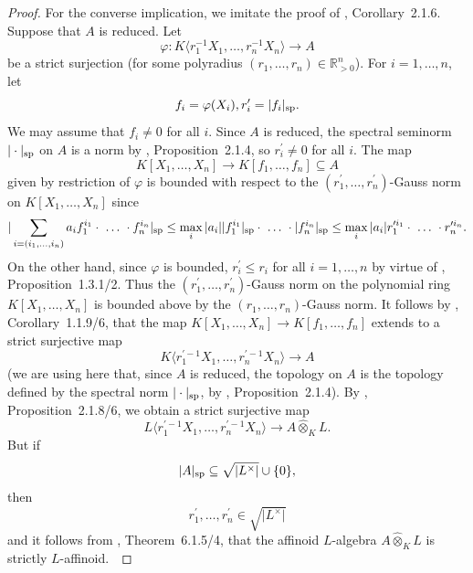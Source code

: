 \begin{proof}
For the converse implication, we imitate the proof of \cite{Berkovich}, Corollary~2.1.6. Suppose that $A$ is reduced. Let \begin{equation*}\varphi: K\langle r_{1}^{-1}X_{1},\dots, r_{n}^{-1}X_{n}\rangle\to A\end{equation*}be a strict surjection (for some polyradius $(r_1,\dots, r_n)\in\mathbb{R}_{>0}^{n}$). For $i=1,\dots, n$, let \begin{equation*}f_{i}=\varphi(X_{i}), r_{i}^{\prime}=\vert f_{i}\vert_{\mathrm{sp}}.\end{equation*}We may assume that $f_{i}\neq0$ for all $i$. Since $A$ is reduced, the spectral seminorm $\vert\cdot\vert_{\mathrm{sp}}$ on $A$ is a norm by \cite{Berkovich}, Proposition~2.1.4, so $r_{i}^{\prime}\neq 0$ for all $i$. The map \begin{equation*}K[X_1,\dots, X_n]\to K[f_1,\dots, f_n]\subseteq A\end{equation*}given by restriction of $\varphi$ is bounded with respect to the $(r_{1}^{\prime},\dots, r_{n}^{\prime})$-Gauss norm on $K[X_1,\dots, X_n]$ since \begin{equation*}\vert \sum_{i=(i_1,\dots, i_n)}a_{i}f_{1}^{i_{1}}\cdot~\dots~\cdot f_{n}^{i_{n}}\vert_{\mathrm{sp}}\leq \max_{i}\vert a_{i}\vert \vert f_{1}^{i_{1}}\vert_{\mathrm{sp}}\cdot~\dots~\cdot \vert f_{n}^{i_{n}}\vert_{\mathrm{sp}}\leq\max_{i}\vert a_{i}\vert r_{1}^{\prime i_{1}}\cdot~\dots~\cdot r_{n}^{\prime i_{n}}.\end{equation*}On the other hand, since $\varphi$ is bounded, $r_{i}^{\prime}\leq r_{i}$ for all $i=1,\dots, n$ by virtue of \cite{BGR}, Proposition~1.3.1/2. Thus the $(r_{1}^{\prime},\dots, r_{n}^{\prime})$-Gauss norm on the polynomial ring $K[X_1,\dots, X_n]$ is bounded above by the $(r_1,\dots, r_n)$-Gauss norm. It follows by \cite{BGR}, Corollary~1.1.9/6, that the map $K[X_1,\dots, X_n]\to K[f_1,\dots, f_n]$ extends to a strict surjective map \begin{equation*}K\langle r_{1}^{\prime-1}X_{1},\dots, r_{n}^{\prime-1}X_{n}\rangle\to A\end{equation*}(we are using here that, since $A$ is reduced, the topology on $A$ is the topology defined by the spectral norm $\vert\cdot\vert_{\mathrm{sp}}$, by \cite{Berkovich}, Proposition~2.1.4). By \cite{BGR}, Proposition~2.1.8/6, we obtain a strict surjective map \begin{equation*}L\langle r_{1}^{\prime-1}X_{1},\dots, r_{n}^{\prime-1}X_{n}\rangle\to A\widehat{\otimes}_{K}L.\end{equation*}But if \begin{equation*}\vert A\vert_{\mathrm{sp}}\subseteq \sqrt{\vert L^{\times}\vert}\cup\{0\},\end{equation*}then \begin{equation*}r_{1}^{\prime},\dots, r_{n}^{\prime}\in \sqrt{\vert L^{\times}\vert}\end{equation*}and it follows from \cite{BGR}, Theorem~6.1.5/4, that the affinoid $L$-algebra $A\widehat{\otimes}_{K}L$ is strictly $L$-affinoid. \end{proof}
